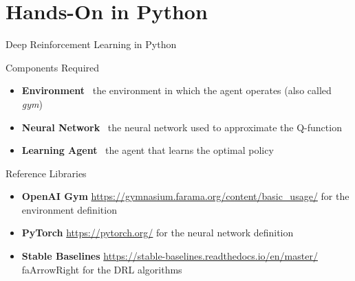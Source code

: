 \documentclass[presentation, 9pt]{beamer}\mode<presentation>{\usetheme{AMSBolognaFC}}
\begin{document}
\section{Hands-On in Python}
\begin{frame}{Deep Reinforcement Learning in Python}
\begin{block}{Components Required}
	\begin{itemize}
		\item \textbf{Environment} \faArrowRight \, the environment in which the agent operates (also called \textit{gym})
		\item \textbf{Neural Network} \faArrowRight \, the neural network used to approximate the Q-function
		\item \textbf{Learning Agent} \faArrowRight \, the agent that learns the optimal policy
	\end{itemize}
\end{block}
\begin{block}{Reference Libraries}
	\begin{itemize}
		\item \textbf{OpenAI Gym} \url{https://gymnasium.farama.org/content/basic_usage/} \faArrowRight for the environment definition
		\item \textbf{PyTorch} \url{https://pytorch.org/} \faArrowRight for the neural network definition
		\item \textbf{Stable Baselines}  \url{https://stable-baselines.readthedocs.io/en/master/} \,faArrowRight for the DRL algorithms
	\end{itemize}
\end{block}
\end{frame}
\end{document}
